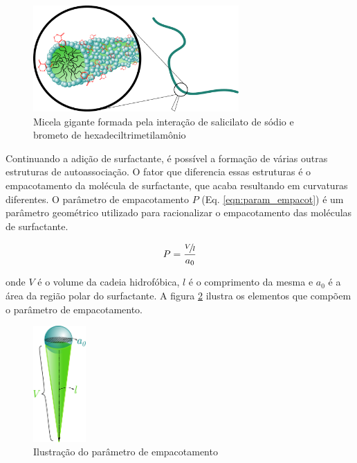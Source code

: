 	
	\begin{figure}[H]
		\centering
		\includegraphics[width=0.7\textwidth]{./imagens/introducao/micela_gigante}
		\caption{Micela gigante formada pela interação de salicilato de sódio e brometo de hexadeciltrimetilamônio}
		\label{fig:micela_gigante}
	\end{figure}
	
	Continuando a adição de surfactante, é possível a formação de várias outras estruturas de autoassociação. O fator que diferencia essas estruturas é o empacotamento da molécula de surfactante, que acaba resultando em curvaturas diferentes. O parâmetro de empacotamento \(P\) (Eq. \ref{eqn:param_empacot}) é um parâmetro geométrico utilizado para racionalizar o empacotamento das moléculas de surfactante.
	
	\begin{equation}
		P = \dfrac{\sfrac{V\!}{l}}{a_0}
		\label{eqn:param_empacot}
	\end{equation}
	
	\noindent onde \(V\) é o volume da cadeia hidrofóbica, \(l\) é o comprimento da mesma e \(a_0\) é a área da região polar do surfactante. A figura \ref{fig:param_empacotamento} ilustra os elementos que compõem o parâmetro de empacotamento.
	
	\begin{figure}[H]
		\centering
		\includegraphics[width=2cm]{imagens/introducao/param_empacotamento}
		\caption{Ilustração do parâmetro de empacotamento}
		\label{fig:param_empacotamento}
	\end{figure}
	
